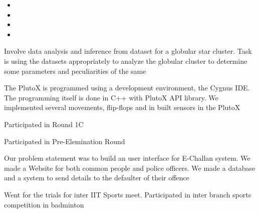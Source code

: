 \begin{itemize}
  \item {}
  \item{}
  \item{}
  \item{}
\end{itemize}

{Involve data analysis and inference from dataset for a globular star cluster. Task is using the datasets appropriately to analyze the globular cluster to determine some parameters and peculiarities of the same}
{}

{The PlutoX is programmed using a development environment, the Cygnus IDE. The programming itself is done in C++ with PlutoX API library. We implemented several movements, flip-flops and in built sensors in the PlutoX}
{}

{Participated in Round 1C}
{}

{Participated in Pre-Elemination Round}
{}

{Our problem statement was to build an user interface for E-Challan system. We made a Website for both common people and police officers. We made a database and a system to send details to the defaulter of their offence}
{}


{Went for the trials for inter IIT Sports meet. Participated in inter branch sports competition in badminton}



